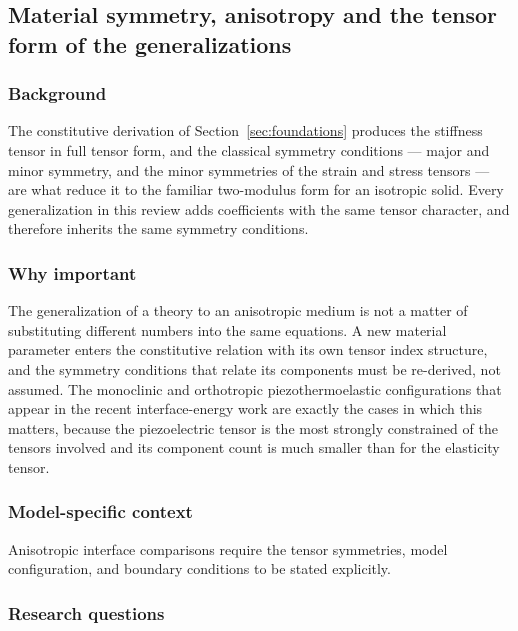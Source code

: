 \subsection{Material symmetry, anisotropy and the tensor form of the generalizations}
\label{sec:15.9}

\subsubsection{Background}

The constitutive derivation of Section~\ref{sec:foundations} produces the stiffness tensor in full tensor form, and the classical symmetry conditions --- major and minor symmetry, and the minor symmetries of the strain and stress tensors --- are what reduce it to the familiar two-modulus form for an isotropic solid. Every generalization in this review adds coefficients with the same tensor character, and therefore inherits the same symmetry conditions.

\subsubsection{Why important}

The generalization of a theory to an anisotropic medium is not a matter of substituting different numbers into the same equations. A new material parameter enters the constitutive relation with its own tensor index structure, and the symmetry conditions that relate its components must be re-derived, not assumed. The monoclinic and orthotropic piezothermoelastic configurations that appear in the recent interface-energy work \cite{Barak2023JTS} are exactly the cases in which this matters, because the piezoelectric tensor is the most strongly constrained of the tensors involved and its component count is much smaller than for the elasticity tensor.

\subsubsection{Model-specific context}

Anisotropic interface comparisons require the tensor symmetries, model configuration, and boundary conditions to be stated explicitly.

\subsubsection{Research questions}

